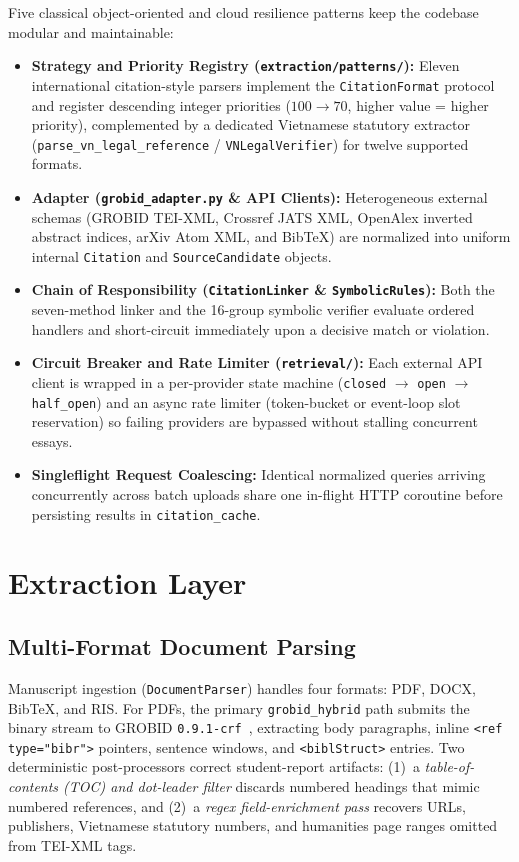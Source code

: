 Five classical object-oriented and cloud resilience patterns keep the codebase modular and maintainable:
\begin{itemize}
    \item \textbf{Strategy and Priority Registry (\texttt{extraction/patterns/}):} Eleven international citation-style parsers implement the \texttt{CitationFormat} protocol and register descending integer priorities ($100 \rightarrow 70$, higher value = higher priority), complemented by a dedicated Vietnamese statutory extractor (\texttt{parse\_vn\_legal\_reference} / \texttt{VNLegalVerifier}) for twelve supported formats.
    \item \textbf{Adapter (\texttt{grobid\_adapter.py} \& API Clients):} Heterogeneous external schemas (GROBID TEI-XML, Crossref JATS XML, OpenAlex inverted abstract indices, arXiv Atom XML, and BibTeX) are normalized into uniform internal \texttt{Citation} and \texttt{SourceCandidate} objects.
    \item \textbf{Chain of Responsibility (\texttt{CitationLinker} \& \texttt{SymbolicRules}):} Both the seven-method linker and the 16-group symbolic verifier evaluate ordered handlers and short-circuit immediately upon a decisive match or violation.
    \item \textbf{Circuit Breaker and Rate Limiter (\texttt{retrieval/}):} Each external API client is wrapped in a per-provider state machine (\texttt{closed} $\rightarrow$ \texttt{open} $\rightarrow$ \texttt{half\_open}) and an async rate limiter (token-bucket or event-loop slot reservation) so failing providers are bypassed without stalling concurrent essays.
    \item \textbf{Singleflight Request Coalescing:} Identical normalized queries arriving concurrently across batch uploads share one in-flight HTTP coroutine before persisting results in \texttt{citation\_cache}.
\end{itemize}

\section{Extraction Layer}

\subsection{Multi-Format Document Parsing}

Manuscript ingestion (\texttt{DocumentParser}) handles four formats: PDF, DOCX, BibTeX, and RIS. For PDFs, the primary \texttt{grobid\_hybrid} path submits the binary stream to GROBID \texttt{0.9.1-crf}~\cite{Lopez2009}, extracting body paragraphs, inline \texttt{<ref type="bibr">} pointers, sentence windows, and \texttt{<biblStruct>} entries. Two deterministic post-processors correct student-report artifacts: (1)~a \emph{table-of-contents (TOC) and dot-leader filter} discards numbered headings that mimic numbered references, and (2)~a \emph{regex field-enrichment pass} recovers URLs, publishers, Vietnamese statutory numbers, and humanities page ranges omitted from TEI-XML tags.

